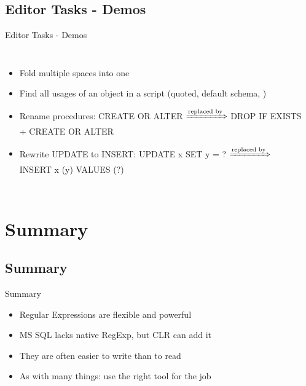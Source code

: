 \documentclass[english,aspectratio=169]{beamer}
\begin{document}
\subsection{Editor Tasks - Demos}
\begin{frame}{Editor Tasks - Demos}
\begin{columns}
        \begin{itemize}
        \item Fold multiple spaces into one
        \item Find all usages of an object in a script (quoted, default schema, \textellipsis)
        \item Rename procedures: CREATE OR ALTER $\xRightarrow{\text{replaced by}}$ DROP IF EXISTS + CREATE OR ALTER
        \item Rewrite UPDATE to INSERT: UPDATE x SET y = ? $\xRightarrow{\text{replaced by}}$ INSERT x (y) VALUES (?)
        \end{itemize}
        \begin{center}
        \end{center}
\end{columns}
\end{frame}

\section{Summary}

\subsection*{Summary}
\begin{frame}{Summary}

\begin{itemize}
\item Regular Expressions are flexible and powerful
\item MS SQL lacks native RegExp, but CLR can add it
\item They are often easier to write than to read
\item As with many things: use the right tool for the job
\end{itemize}
\end{frame}
\end{document}
